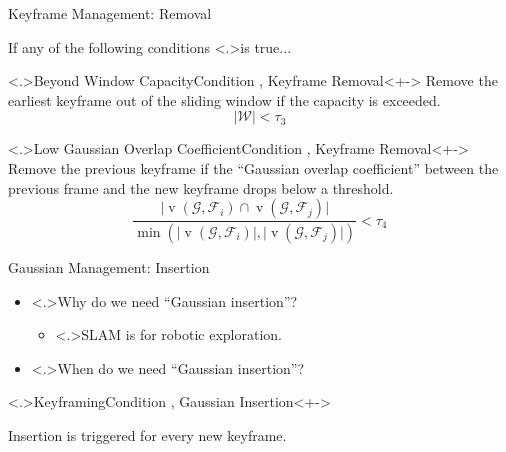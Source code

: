 \begin{Frame}{Keyframe Management: Removal}
	\begin{overprint}[\textheight]
		\par If \alert<+>{any} of the following conditions \alert<.>{is true}...
		\vspace*{\fill}
		\begin{block}{\alert<.>{Beyond Window Capacity}\hfill Condition , Keyframe Removal}<+->
			Remove the earliest keyframe out of the sliding window if the capacity is exceeded.
			\begin{equation}
				\vert \mathcal{W} \vert < \tau_3
			\end{equation}
		\end{block}
		\vspace*{\fill}
		\begin{block}{\alert<.>{Low Gaussian Overlap Coefficient}\hfill Condition , Keyframe Removal}<+->
			Remove the previous keyframe if the ``Gaussian overlap coefficient'' between the previous frame and the new keyframe drops below a threshold.
			\begin{equation}
				\frac{\vert \operatorname{v}\left(\mathcal{G}, \mathcal{F}_{i}\right) \cap \operatorname{v}\left(\mathcal{G}, \mathcal{F}_{j}\right) \vert}{\min \left(\vert\operatorname{v}\left(\mathcal{G}, \mathcal{F}_{i}\right) \vert, \vert\operatorname{v}\left(\mathcal{G}, \mathcal{F}_{j}\right) \vert\right)} < \tau_4
			\end{equation}
		\end{block}
	\end{overprint}
\end{Frame}

\begin{Frame}{Gaussian Management: Insertion}
	\begin{itemize}
		\setlength{\itemsep}{1.5ex}
		\item<+-> \alert<.>{Why} do we need ``Gaussian insertion''?
			\vspace*{1.5ex}
			\begin{itemize}
				\setlength{\itemsep}{1.5ex}
				\item<+-> \alert<.>{SLAM} is for robotic exploration.
			\end{itemize}
	\end{itemize}
	\vspace*{\fill}
	\begin{itemize}
		\setlength{\itemsep}{1.5ex}
		\item<+-> \alert<.>{When} do we need ``Gaussian insertion''?
	\end{itemize}
	\begin{block}{\alert<.>{Keyframing}\hfill Condition , Gaussian Insertion}<+->
		\par Insertion is triggered for every new keyframe.
	\end{block}
\end{Frame}

